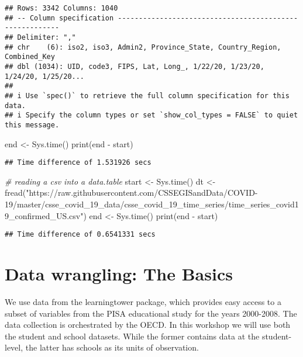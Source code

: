 \documentclass[
]{article}
\newenvironment{Shaded}{\begin{snugshade}}{\end{snugshade}}
\newcommand{\CommentTok}[1]{\textcolor[rgb]{0.56,0.35,0.01}{\textit{#1}}}
\newcommand{\FunctionTok}[1]{\textcolor[rgb]{0.00,0.00,0.00}{#1}}
\newcommand{\NormalTok}[1]{#1}
\newcommand{\OtherTok}[1]{\textcolor[rgb]{0.56,0.35,0.01}{#1}}
\newcommand{\SpecialCharTok}[1]{\textcolor[rgb]{0.00,0.00,0.00}{#1}}
\newcommand{\StringTok}[1]{\textcolor[rgb]{0.31,0.60,0.02}{#1}}
\begin{document}
\begin{verbatim}
## Rows: 3342 Columns: 1040
## -- Column specification --------------------------------------------------------
## Delimiter: ","
## chr    (6): iso2, iso3, Admin2, Province_State, Country_Region, Combined_Key
## dbl (1034): UID, code3, FIPS, Lat, Long_, 1/22/20, 1/23/20, 1/24/20, 1/25/20...
## 
## i Use `spec()` to retrieve the full column specification for this data.
## i Specify the column types or set `show_col_types = FALSE` to quiet this message.
\end{verbatim}

\begin{Shaded}
\begin{Highlighting}[]
\NormalTok{end }\OtherTok{\textless{}{-}} \FunctionTok{Sys.time}\NormalTok{()}
\FunctionTok{print}\NormalTok{(end }\SpecialCharTok{{-}}\NormalTok{ start)}
\end{Highlighting}
\end{Shaded}

\begin{verbatim}
## Time difference of 1.531926 secs
\end{verbatim}

\begin{Shaded}
\begin{Highlighting}[]
\CommentTok{\# reading a csv into a data.table}
\NormalTok{start }\OtherTok{\textless{}{-}} \FunctionTok{Sys.time}\NormalTok{()}
\NormalTok{dt }\OtherTok{\textless{}{-}} \FunctionTok{fread}\NormalTok{(}\StringTok{"https://raw.githubusercontent.com/CSSEGISandData/COVID{-}19/master/csse\_covid\_19\_data/csse\_covid\_19\_time\_series/time\_series\_covid19\_confirmed\_US.csv"}\NormalTok{)}
\NormalTok{end }\OtherTok{\textless{}{-}} \FunctionTok{Sys.time}\NormalTok{()}
\FunctionTok{print}\NormalTok{(end }\SpecialCharTok{{-}}\NormalTok{ start)}
\end{Highlighting}
\end{Shaded}

\begin{verbatim}
## Time difference of 0.6541331 secs
\end{verbatim}

\hypertarget{data-wrangling-the-basics}{%
\section{Data wrangling: The Basics}\label{data-wrangling-the-basics}}

We use data from the learningtower package, which provides easy access
to a subset of variables from the PISA educational study for the years
2000-2008. The data collection is orchestrated by the OECD. In this
workshop we will use both the student and school datasets. While the
former contains data at the student-level, the latter has schools as its
units of observation.
\end{document}
